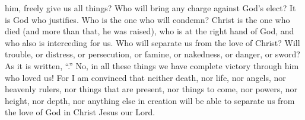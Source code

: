 {him,
freely give
us
all things?
Who
will bring any charge
against
God’s
elect? It is God
who justifies.
Who
is the one who will condemn? Christ
is the one who died
(and
more
than that, he was raised), who
is
at
the right hand
of God,
and
who
also is interceding
for
us.
Who
will separate
us
from
the love
of Christ? Will trouble,
or
distress,
or
persecution,
or
famine,
or
nakedness,
or
danger,
or
sword?
As
it is written, “{}.”
No,
in
all
these things
we have complete victory
through
him who loved
us!
For
I am convinced
that
neither
death,
nor
life,
nor
angels,
nor
heavenly rulers,
nor
things that are present,
nor
things to come,
nor
powers,
nor
height,
nor
depth,
nor
anything
else
in creation
will be able
to separate
us
from
the love
of God
in
Christ
Jesus
our
Lord.

}
